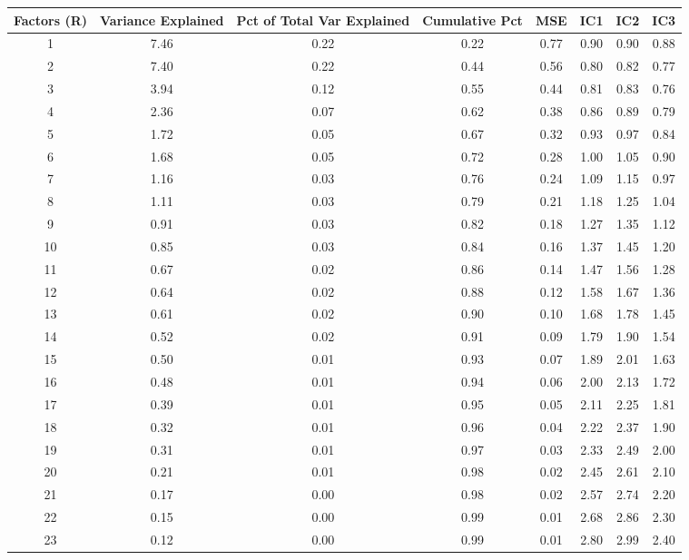 \documentclass[11pt, letterpaper]{article}\usepackage[]{graphicx}\usepackage[]{color}
\begin{document}
\begin{table}[H]
\centering
\begingroup\scriptsize
\begin{tabular}{cccccccc}
  \hline
Factors (R) & Variance Explained & Pct of Total Var Explained & Cumulative Pct & MSE & IC1 & IC2 & IC3 \\ 
  \hline
  1 & 7.46 & 0.22 & 0.22 & 0.77 & 0.90 & 0.90 & 0.88 \\ 
    2 & 7.40 & 0.22 & 0.44 & 0.56 & 0.80 & 0.82 & 0.77 \\ 
    3 & 3.94 & 0.12 & 0.55 & 0.44 & 0.81 & 0.83 & 0.76 \\ 
    4 & 2.36 & 0.07 & 0.62 & 0.38 & 0.86 & 0.89 & 0.79 \\ 
    5 & 1.72 & 0.05 & 0.67 & 0.32 & 0.93 & 0.97 & 0.84 \\ 
    6 & 1.68 & 0.05 & 0.72 & 0.28 & 1.00 & 1.05 & 0.90 \\ 
    7 & 1.16 & 0.03 & 0.76 & 0.24 & 1.09 & 1.15 & 0.97 \\ 
    8 & 1.11 & 0.03 & 0.79 & 0.21 & 1.18 & 1.25 & 1.04 \\ 
    9 & 0.91 & 0.03 & 0.82 & 0.18 & 1.27 & 1.35 & 1.12 \\ 
   10 & 0.85 & 0.03 & 0.84 & 0.16 & 1.37 & 1.45 & 1.20 \\ 
   11 & 0.67 & 0.02 & 0.86 & 0.14 & 1.47 & 1.56 & 1.28 \\ 
   12 & 0.64 & 0.02 & 0.88 & 0.12 & 1.58 & 1.67 & 1.36 \\ 
   13 & 0.61 & 0.02 & 0.90 & 0.10 & 1.68 & 1.78 & 1.45 \\ 
   14 & 0.52 & 0.02 & 0.91 & 0.09 & 1.79 & 1.90 & 1.54 \\ 
   15 & 0.50 & 0.01 & 0.93 & 0.07 & 1.89 & 2.01 & 1.63 \\ 
   16 & 0.48 & 0.01 & 0.94 & 0.06 & 2.00 & 2.13 & 1.72 \\ 
   17 & 0.39 & 0.01 & 0.95 & 0.05 & 2.11 & 2.25 & 1.81 \\ 
   18 & 0.32 & 0.01 & 0.96 & 0.04 & 2.22 & 2.37 & 1.90 \\ 
   19 & 0.31 & 0.01 & 0.97 & 0.03 & 2.33 & 2.49 & 2.00 \\ 
   20 & 0.21 & 0.01 & 0.98 & 0.02 & 2.45 & 2.61 & 2.10 \\ 
   21 & 0.17 & 0.00 & 0.98 & 0.02 & 2.57 & 2.74 & 2.20 \\ 
   22 & 0.15 & 0.00 & 0.99 & 0.01 & 2.68 & 2.86 & 2.30 \\ 
   23 & 0.12 & 0.00 & 0.99 & 0.01 & 2.80 & 2.99 & 2.40 \\ 

\end{tabular}
\end{table}
\end{document}
